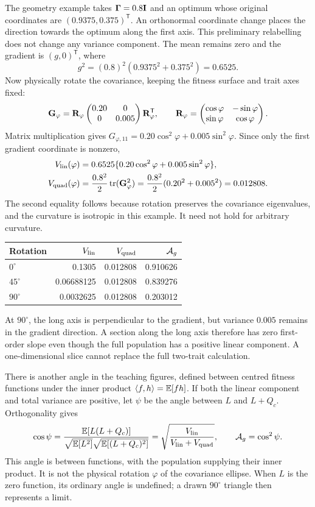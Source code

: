 The geometry example takes $\boldsymbol{\Gamma}=0.8\mathbf{I}$ and an optimum whose original coordinates are $(0.9375,0.375)^{\mathsf T}$. An orthonormal coordinate change places the direction towards the optimum along the first axis. This preliminary relabelling does not change any variance component. The mean remains zero and the gradient is $(g,0)^{\mathsf T}$, where
\[
 g^2=(0.8)^2(0.9375^2+0.375^2)=0.6525.
\]
Now physically rotate the covariance, keeping the fitness surface and trait axes fixed:
\[
 \mathbf{G}_\varphi=\mathbf{R}_\varphi
 \begin{pmatrix}0.20&0\\0&0.005\end{pmatrix}
 \mathbf{R}_\varphi^{\mathsf T},\qquad
 \mathbf{R}_\varphi=
 \begin{pmatrix}\cos\varphi&-\sin\varphi\\
                 \sin\varphi&\cos\varphi\end{pmatrix}.
\]
Matrix multiplication gives
$G_{\varphi,11}=0.20\cos^2\varphi+0.005\sin^2\varphi$. Since only the first gradient coordinate is nonzero,
\begin{align}
 V_{\mathrm{lin}}(\varphi)&=0.6525\{0.20\cos^2\varphi+0.005\sin^2\varphi\},\\
 V_{\mathrm{quad}}(\varphi)&=\frac{0.8^2}{2}\operatorname{tr}(\mathbf{G}_\varphi^2)
 =\frac{0.8^2}{2}(0.20^2+0.005^2)=0.012808.
\end{align}
The second equality follows because rotation preserves the covariance eigenvalues, and the curvature is isotropic in this example. It need not hold for arbitrary curvature.

\begin{center}
\begin{tabular}{@{}lrrr@{}}
\toprule Rotation & $V_{\mathrm{lin}}$ & $V_{\mathrm{quad}}$ & $\mathcal A_g$\\
\midrule
$0^\circ$ &0.1305&0.012808&0.910626\\
$45^\circ$&0.06688125&0.012808&0.839276\\
$90^\circ$&0.0032625&0.012808&0.203012\\
\bottomrule
\end{tabular}
\end{center}
At $90^\circ$, the long axis is perpendicular to the gradient, but variance $0.005$ remains in the gradient direction. A section along the long axis therefore has zero first-order slope even though the full population has a positive linear component. A one-dimensional slice cannot replace the full two-trait calculation.

There is another angle in the teaching figures, defined between centred fitness functions under the inner product $\langle f,h\rangle=\mathbb E[fh]$. If both the linear component and total variance are positive, let $\psi$ be the angle between $L$ and $L+Q_c$. Orthogonality gives
\[
 \cos\psi
 =\frac{\mathbb E[L(L+Q_c)]}
 {\sqrt{\mathbb E[L^2]}\sqrt{\mathbb E[(L+Q_c)^2]}}
 =\sqrt{\frac{V_{\mathrm{lin}}}{V_{\mathrm{lin}}+V_{\mathrm{quad}}}},
 \qquad \mathcal A_g=\cos^2\psi.
\]
This angle is between functions, with the population supplying their inner product. It is not the physical rotation $\varphi$ of the covariance ellipse. When $L$ is the zero function, its ordinary angle is undefined; a drawn $90^\circ$ triangle then represents a limit.

